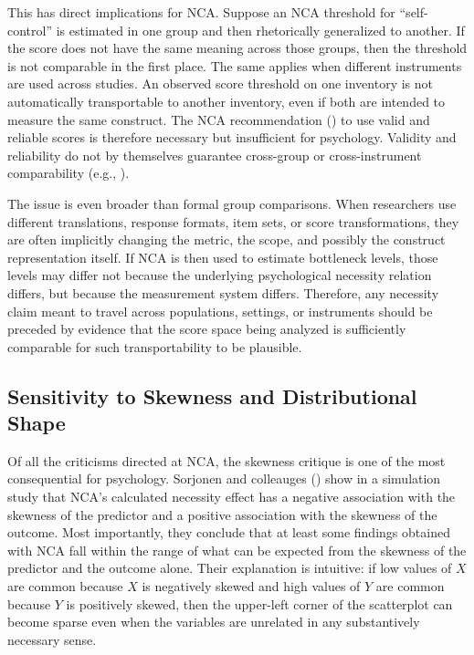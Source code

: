 \documentclass[
  man,
  longtable,
  nolmodern,
  notxfonts,
  notimes,
  colorlinks=true,linkcolor=blue,citecolor=blue,urlcolor=blue]{apa7}
\begin{document}
This has direct implications for NCA. Suppose an NCA threshold for
``self-control'' is estimated in one group and then rhetorically
generalized to another. If the score does not have the same meaning
across those groups, then the threshold is not comparable in the first
place. The same applies when different instruments are used across
studies. An observed score threshold on one inventory is not
automatically transportable to another inventory, even if both are
intended to measure the same construct. The NCA recommendation
() to
use valid and reliable scores is therefore necessary but insufficient
for psychology. Validity and reliability do not by themselves guarantee
cross-group or cross-instrument comparability (e.g.,
).

The issue is even broader than formal group comparisons. When
researchers use different translations, response formats, item sets, or
score transformations, they are often implicitly changing the metric,
the scope, and possibly the construct representation itself. If NCA is
then used to estimate bottleneck levels, those levels may differ not
because the underlying psychological necessity relation differs, but
because the measurement system differs. Therefore, any necessity claim
meant to travel across populations, settings, or instruments should be
preceded by evidence that the score space being analyzed is sufficiently
comparable for such transportability to be plausible.

\subsection{Sensitivity to Skewness and Distributional
Shape}\label{sensitivity-to-skewness-and-distributional-shape}

Of all the criticisms directed at NCA, the skewness critique is one of
the most consequential for psychology. Sorjonen and colleauges
() show in a
simulation study that NCA's calculated necessity effect has a negative
association with the skewness of the predictor and a positive
association with the skewness of the outcome. Most importantly, they
conclude that at least some findings obtained with NCA fall within the
range of what can be expected from the skewness of the predictor and the
outcome alone. Their explanation is intuitive: if low values of \(X\)
are common because \(X\) is negatively skewed and high values of \(Y\)
are common because \(Y\) is positively skewed, then the upper-left
corner of the scatterplot can become sparse even when the variables are
unrelated in any substantively necessary sense.
\end{document}
